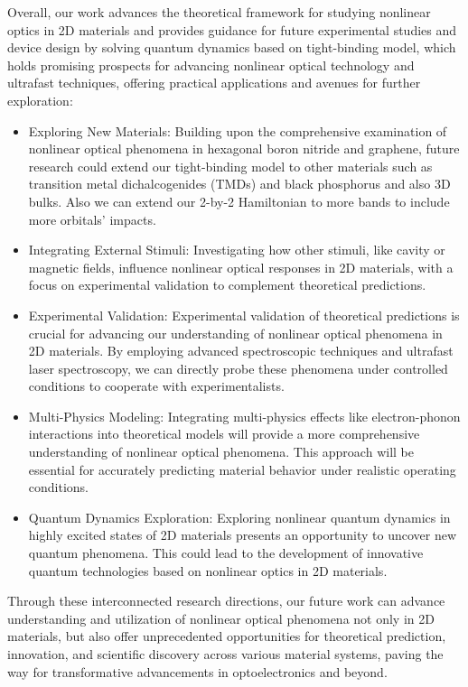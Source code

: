 Overall, our work advances the theoretical framework for studying nonlinear optics in 2D materials and provides guidance for future experimental studies and device design by solving quantum dynamics based on tight-binding model, which holds promising prospects for advancing nonlinear optical technology and ultrafast techniques, offering practical applications and avenues for further exploration:
\begin{itemize}
	\item Exploring New Materials: Building upon the comprehensive examination of nonlinear optical phenomena in hexagonal boron nitride and graphene, future research could extend our tight-binding model to other materials such as transition metal dichalcogenides (TMDs) and black phosphorus and also 3D bulks. Also we can extend our 2-by-2 Hamiltonian to more bands to include more orbitals' impacts.

	\item Integrating External Stimuli: Investigating how other stimuli, like cavity or magnetic fields, influence nonlinear optical responses in 2D materials, with a focus on experimental validation to complement theoretical predictions.

	\item Experimental Validation: Experimental validation of theoretical predictions is crucial for advancing our understanding of nonlinear optical phenomena in 2D materials. By employing advanced spectroscopic techniques and ultrafast laser spectroscopy, we can directly probe these phenomena under controlled conditions to cooperate with experimentalists.

	\item Multi-Physics Modeling: Integrating multi-physics effects like electron-phonon interactions into theoretical models will provide a more comprehensive understanding of nonlinear optical phenomena. This approach will be essential for accurately predicting material behavior under realistic operating conditions.

	\item Quantum Dynamics Exploration: Exploring nonlinear quantum dynamics in highly excited states of 2D materials presents an opportunity to uncover new quantum phenomena. This could lead to the development of innovative quantum technologies based on nonlinear optics in 2D materials.

\end{itemize}
Through these interconnected research directions, our future work can advance understanding and utilization of nonlinear optical phenomena not only in 2D materials, but also offer unprecedented opportunities for theoretical prediction, innovation, and scientific discovery across various material systems, paving the way for transformative advancements in optoelectronics and beyond.
